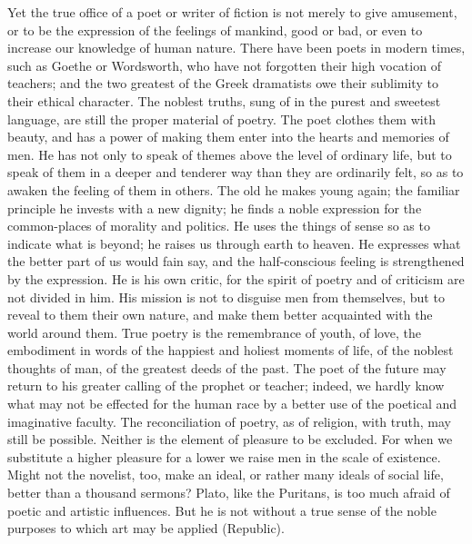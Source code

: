 \documentclass[11pt,letter]{article}
\begin{document}
\par  Yet the true office of a poet or writer of fiction is not merely to give amusement, or to be the expression of the feelings of mankind, good or bad, or even to increase our knowledge of human nature. There have been poets in modern times, such as Goethe or Wordsworth, who have not forgotten their high vocation of teachers; and the two greatest of the Greek dramatists owe their sublimity to their ethical character. The noblest truths, sung of in the purest and sweetest language, are still the proper material of poetry. The poet clothes them with beauty, and has a power of making them enter into the hearts and memories of men. He has not only to speak of themes above the level of ordinary life, but to speak of them in a deeper and tenderer way than they are ordinarily felt, so as to awaken the feeling of them in others. The old he makes young again; the familiar principle he invests with a new dignity; he finds a noble expression for the common-places of morality and politics. He uses the things of sense so as to indicate what is beyond; he raises us through earth to heaven. He expresses what the better part of us would fain say, and the half-conscious feeling is strengthened by the expression. He is his own critic, for the spirit of poetry and of criticism are not divided in him. His mission is not to disguise men from themselves, but to reveal to them their own nature, and make them better acquainted with the world around them. True poetry is the remembrance of youth, of love, the embodiment in words of the happiest and holiest moments of life, of the noblest thoughts of man, of the greatest deeds of the past. The poet of the future may return to his greater calling of the prophet or teacher; indeed, we hardly know what may not be effected for the human race by a better use of the poetical and imaginative faculty. The reconciliation of poetry, as of religion, with truth, may still be possible. Neither is the element of pleasure to be excluded. For when we substitute a higher pleasure for a lower we raise men in the scale of existence. Might not the novelist, too, make an ideal, or rather many ideals of social life, better than a thousand sermons? Plato, like the Puritans, is too much afraid of poetic and artistic influences. But he is not without a true sense of the noble purposes to which art may be applied (Republic).
\end{document}
